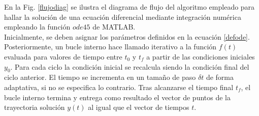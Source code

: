 En la Fig. \ref {flujodiag} se ilustra el diagrama de flujo del algoritmo empleado para hallar la solución de una ecuación diferencial mediante integración numérica empleando la función $ode45$ de MATLAB.\\

\noindent Inicialmente, se deben asignar los parámetros definidos en la ecuación \eqref{defode}.\\

\noindent Posteriormente, un bucle interno hace llamado iterativo a la función $f(t)$ evaluada para valores de tiempo entre $t_0$ y $t_f$ a partir de las condiciones iniciales $y_0$. Para cada ciclo la condición inicial se recalcula siendo la condición final del ciclo anterior. El tiempo se incrementa en un tamaño de paso $\delta t$ de forma adaptativa, si no se especifica lo contrario. Tras alcanzarse el tiempo final $t_f$, el bucle interno termina y entrega como resultado el vector de puntos de la trayectoria solución $y(t)$ al igual que el vector de tiempos $t$. 